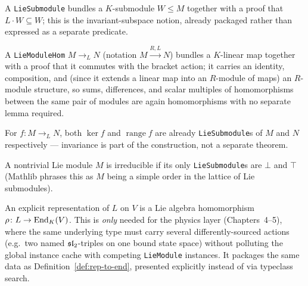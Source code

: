 \begin{definition}
  \label{def:rep-lie-submodule}
  \mathlibok
  A \texttt{LieSubmodule} bundles a $K$-submodule $W \le M$ together with a
  proof that $L \cdot W \subseteq W$; this is the invariant-subspace notion,
  already packaged rather than expressed as a separate predicate.
\end{definition}

\begin{definition}
  \label{def:rep-hom}
  \mathlibok
  A \texttt{LieModuleHom} $M \to_{\!L} N$ (notation $M \xrightarrow{R,L} N$)
  bundles a $K$-linear map together with a proof that it commutes with the
  bracket action; it carries an identity, composition, and (since it extends
  a linear map into an $R$-module of maps) an $R$-module structure, so sums,
  differences, and scalar multiples of homomorphisms between the same pair
  of modules are again homomorphisms with no separate lemma required.
\end{definition}

\begin{theorem}
  \label{thm:rep-hom-ker-range}
  \mathlibok
  For $f \colon M \to_{\!L} N$, both $\ker f$ and $\operatorname{range} f$ are
  already \texttt{LieSubmodule}s of $M$ and $N$ respectively --- invariance
  is part of the construction, not a separate theorem.
\end{theorem}

\begin{definition}[Irreducibility]
  \label{def:rep-irreducible-generic}
  \mathlibok
  A nontrivial Lie module $M$ is irreducible if its only \texttt{LieSubmodule}s
  are $\bot$ and $\top$ (Mathlib phrases this as $M$ being a simple order in
  the lattice of Lie submodules).
\end{definition}

\begin{definition}
  \label{def:rep-explicit}
  \leanok
  An explicit representation of $L$ on $V$ is a Lie algebra homomorphism
  $\rho \colon L \to \operatorname{End}_K(V)$. This is \emph{only} needed for the physics
  layer (Chapters~4--5), where the same underlying type must carry several
  differently-sourced actions (e.g.\ two named $\mathfrak{sl}_2$-triples on one bound
  state space) without polluting the global instance cache with competing
  \texttt{LieModule} instances. It packages the same data as
  Definition~\ref{def:rep-to-end}, presented explicitly instead of via
  typeclass search.
\end{definition}


